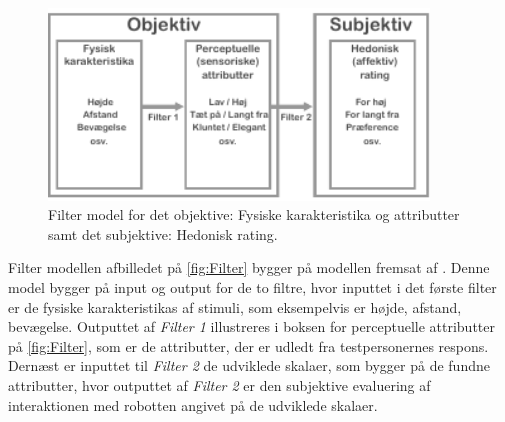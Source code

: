 %
\begin{figure}[H]
\centering
\includegraphics[width = 0.9\textwidth]{Figure/Filter} 
\caption{Filter model for det objektive: Fysiske karakteristika og attributter samt det subjektive: Hedonisk rating.}
\label{fig:Filter}
\end{figure}
\noindent
%
Filter modellen afbilledet på \autoref{fig:Filter} bygger på modellen fremsat af \textcite[s. 4]{PDF:AttributeIdentificatoin}. Denne model bygger på input og output for de to filtre, hvor inputtet i det første filter er de fysiske karakteristikas af stimuli, som eksempelvis er højde, afstand, bevægelse. Outputtet af \textit{Filter 1} illustreres i boksen for perceptuelle attributter på \autoref{fig:Filter}, som er de attributter, der er udledt fra testpersonernes respons. Dernæst er inputtet til \textit{Filter 2} de udviklede skalaer, som bygger på de fundne attributter, hvor outputtet af \textit{Filter 2} er den subjektive evaluering af interaktionen med robotten angivet på de udviklede skalaer. 


